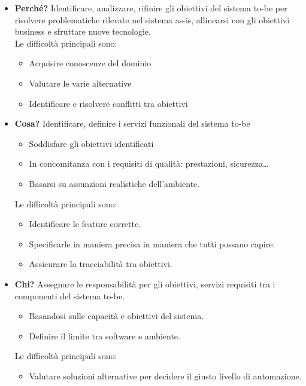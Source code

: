 \documentclass[../main.tex]{subfiles}
\begin{document}
\begin{itemize}
	\item \textbf{Perché?} Identificare, analizzare, rifinire gli obiettivi del sistema to-be per risolvere problematiche rilevate nel sistema as-is, allinearsi con gli obiettivi business e sfruttare nuove tecnologie.
	\\
	Le difficoltà principali sono:
	\begin{itemize}
		\item Acquisire conoscenze del dominio
		\item Valutare le varie alternative
		\item Identificare e risolvere conflitti tra obiettivi
	\end{itemize}
	\item \textbf{Cosa?} Identificare, definire i servizi funzionali del sistema to-be
	\begin{itemize}
		\item Soddisfare gli obiettivi identificati 
		\item In concomitanza con i requisiti di qualità: prestazioni, sicurezza\dots
		\item Basarsi su assunzioni realistiche dell'ambiente.
	\end{itemize}
	Le difficoltà principali sono:
	\begin{itemize}
		\item Identificare le feature corrette.
		\item Specificarle in maniera precisa in maniera che tutti possano capire.
		\item Assicurare la tracciabilità tra obiettivi.
	\end{itemize}
	\item \textbf{Chi?} Assegnare le responsabilità per gli obiettivi, servizi requisiti tra i componenti del sistema to-be.
	\begin{itemize}
		\item Basandosi sulle capacità e obiettivi del sistema.
		\item Definire il limite tra software e ambiente.
	\end{itemize}
	Le difficoltà principali sono:
	\begin{itemize}
		\item Valutare soluzioni alternative per decidere il giusto livello di automazione.
	\end{itemize}
\end{itemize}
\end{document}
